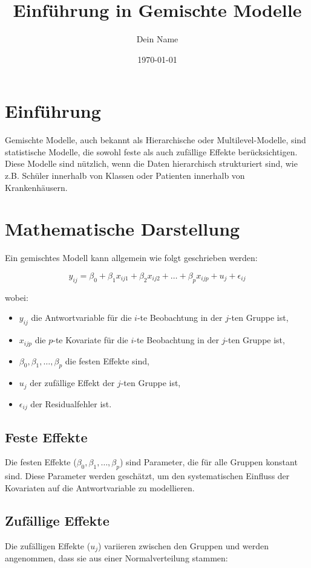\documentclass{article}
\title{Einführung in Gemischte Modelle}
\author{Dein Name}
\date{\today}
\begin{document}
	\maketitle
	
	\section{Einführung}
	Gemischte Modelle, auch bekannt als Hierarchische oder Multilevel-Modelle, sind statistische Modelle, die sowohl feste als auch zufällige Effekte berücksichtigen. Diese Modelle sind nützlich, wenn die Daten hierarchisch strukturiert sind, wie z.B. Schüler innerhalb von Klassen oder Patienten innerhalb von Krankenhäusern.
	
	\section{Mathematische Darstellung}
	Ein gemischtes Modell kann allgemein wie folgt geschrieben werden:
	
	\[
	y_{ij} = \beta_0 + \beta_1 x_{ij1} + \beta_2 x_{ij2} + \ldots + \beta_p x_{ijp} + u_{j} + \epsilon_{ij}
	\]
	
	wobei:
	\begin{itemize}
		\item \( y_{ij} \) die Antwortvariable für die \(i\)-te Beobachtung in der \(j\)-ten Gruppe ist,
		\item \( x_{ijp} \) die \(p\)-te Kovariate für die \(i\)-te Beobachtung in der \(j\)-ten Gruppe ist,
		\item \( \beta_0, \beta_1, \ldots, \beta_p \) die festen Effekte sind,
		\item \( u_{j} \) der zufällige Effekt der \(j\)-ten Gruppe ist,
		\item \( \epsilon_{ij} \) der Residualfehler ist.
	\end{itemize}
	
	\subsection{Feste Effekte}
	Die festen Effekte (\(\beta_0, \beta_1, \ldots, \beta_p\)) sind Parameter, die für alle Gruppen konstant sind. Diese Parameter werden geschätzt, um den systematischen Einfluss der Kovariaten auf die Antwortvariable zu modellieren.
	
	\subsection{Zufällige Effekte}
	Die zufälligen Effekte (\(u_j\)) variieren zwischen den Gruppen und werden angenommen, dass sie aus einer Normalverteilung stammen:
	
\end{document}
